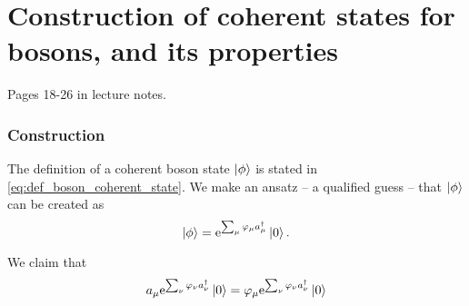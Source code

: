 \section{Construction of coherent states for bosons, and its properties}

Pages 18-26 in lecture notes.

\subsubsection{Construction}
The definition of a coherent boson state $\ket{\phi}$ is stated in \eqref{eq:def_boson_coherent_state}. We make an ansatz -- a qualified guess -- that $\ket{\phi}$ can be created as
\begin{equation}
\label{eq:construction_coherent_boson}
\ket{\phi} = \mathrm{e}^{\sum_\mu\varphi_\mu a_\mu^\dagger}\ket{0}.
\end{equation}

We claim that 
\begin{equation}
\label{unc:indices}
a_\mu\mathrm{e}^{\sum_\nu\varphi_\nu a_\nu^\dagger}\ket{0} = \varphi_\mu\mathrm{e}^{\sum_\nu\varphi_\nu a_\nu^\dagger}\ket{0}
\end{equation} %

